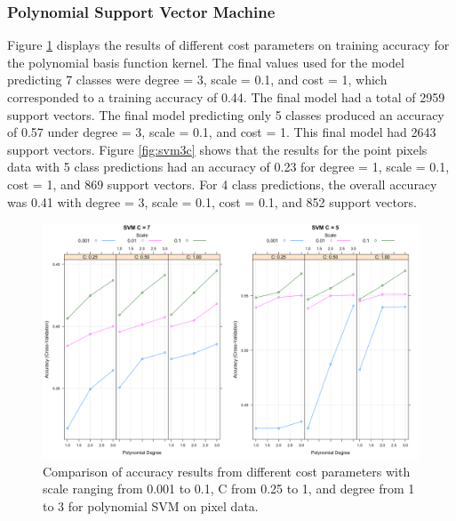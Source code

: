 \documentclass[12pt,twoside]{reedthesis}
\begin{document}
\hypertarget{polynomial-support-vector-machine}{%
\subsubsection{Polynomial Support Vector Machine}\label{polynomial-support-vector-machine}}

Figure \ref{fig:svm3} displays the results of different cost parameters on training accuracy for the polynomial basis function kernel. The final values used for the model predicting 7 classes were degree = 3, scale = 0.1, and cost = 1, which corresponded to a training accuracy of 0.44. The final model had a total of 2959 support vectors. The final model predicting only 5 classes produced an accuracy of 0.57 under degree = 3, scale = 0.1, and cost = 1. This final model had 2643 support vectors. Figure \ref{fig:svm3c} shows that the results for the point pixels data with 5 class predictions had an accuracy of 0.23 for degree = 1, scale = 0.1, cost = 1, and 869 support vectors. For 4 class predictions, the overall accuracy was 0.41 with degree = 3, scale = 0.1, cost = 0.1, and 852 support vectors.
\begin{figure}

{\centering \includegraphics[width=0.9\linewidth]{figure/svm3} 

}

\caption{Comparison of accuracy results from different cost parameters with scale ranging from 0.001 to 0.1, C from 0.25 to 1, and degree from 1 to 3 for polynomial SVM on pixel data.}\label{fig:svm3}
\end{figure}
\end{document}
